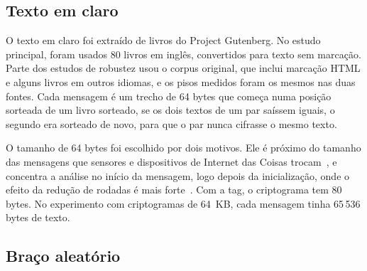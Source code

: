 \subsection{Texto em claro}
\label{sec:met-texto}

O texto em claro foi extraído de livros do Project Gutenberg. No estudo principal, foram usados 80 livros em inglês, convertidos para texto sem marcação. Parte dos estudos de robustez usou o corpus original, que inclui marcação HTML e alguns livros em outros idiomas, e os pisos medidos foram os mesmos nas duas fontes. Cada mensagem é um trecho de 64 bytes que começa numa posição sorteada de um livro sorteado, se os dois textos de um par saíssem iguais, o segundo era sorteado de novo, para que o par nunca cifrasse o mesmo texto.

O tamanho de 64 bytes foi escolhido por dois motivos. Ele é próximo do tamanho das mensagens que sensores e dispositivos de Internet das Coisas trocam~\cite{NIST2018LWCRequirements,IEEE802154_2020}, e concentra a análise no início da mensagem, logo depois da inicialização, onde o efeito da redução de rodadas é mais forte~\cite{Dobraunig2021AsconSecurity,Rohit2021Ascon}. Com a tag, o criptograma tem 80 bytes. No experimento com criptogramas de 64~KB, cada mensagem tinha 65\,536 bytes de texto.

\subsection{Braço aleatório}
\label{sec:met-braco-aleatorio}


